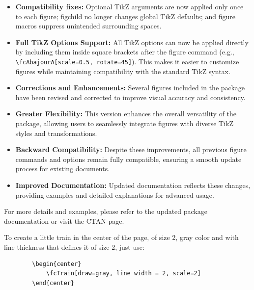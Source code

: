 \documentclass[x11names]{article}
\begin{document}
	\begin{itemize}
		\item \textbf{Compatibility fixes:} Optional TikZ arguments are now applied only once to each figure; figchild no longer changes global TikZ defaults; and figure macros suppress unintended surrounding spaces.
		\item \textbf{Full TikZ Options Support:} All TikZ options can now be applied directly by including them inside square brackets after the figure command (e.g., \verb|\fcAbajourA[scale=0.5, rotate=45]|). This makes it easier to customize figures while maintaining compatibility with the standard TikZ syntax.
		
		\item \textbf{Corrections and Enhancements:} Several figures included in the package have been revised and corrected to improve visual accuracy and consistency.
		
		\item \textbf{Greater Flexibility:} This version enhances the overall versatility of the package, allowing users to seamlessly integrate figures with diverse TikZ styles and transformations.
		
		\item \textbf{Backward Compatibility:} Despite these improvements, all previous figure commands and options remain fully compatible, ensuring a smooth update process for existing documents.
		
		\item \textbf{Improved Documentation:} Updated documentation reflects these changes, providing examples and detailed explanations for advanced usage.
	\end{itemize}
	
	\noindent
	For more details and examples, please refer to the updated package documentation or visit the CTAN page.
	
    To create a little train in the center of the page, of size 2, gray color and with line thickness that defines it of size 2, just use:
	
	\begin{verbatim}
		\begin{center}
			\fcTrain[draw=gray, line width = 2, scale=2]
		\end{center}
	\end{verbatim}
	
	\begin{center}
		\fcTrain[draw=gray, line width = 2, scale=2]
	\end{center}
	
\end{document}
